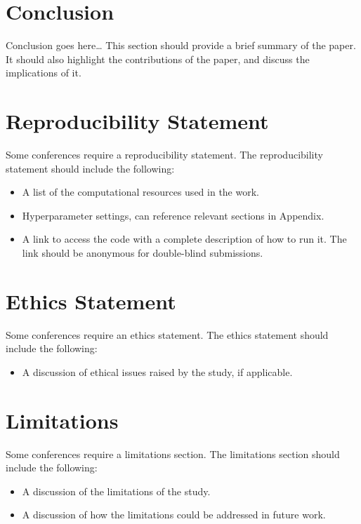 \section{Conclusion}\label{sec:conclusion}

Conclusion goes here\dots{}
This section should provide a brief summary of the paper.
It should also highlight the contributions of the paper,
and discuss the implications of it.


\section{Reproducibility Statement}\label{sec:reproducibility}

Some conferences require a reproducibility statement.
The reproducibility statement
should include the following:
\begin{itemize}
    \item A list of the computational resources used in the work.

    \item Hyperparameter settings,
    can reference relevant sections in Appendix.

    \item A link to access the code
    with a complete description of how to run it.
    The link should be anonymous for double-blind submissions.
\end{itemize}


\section{Ethics Statement}\label{sec:ethics}

Some conferences require an ethics statement.
The ethics statement should include the following:
\begin{itemize}
    \item A discussion of ethical issues raised by the study,
    if applicable.
\end{itemize}


\section{Limitations}\label{sec:limitations}

Some conferences require a limitations section.
The limitations section should include the following:
\begin{itemize}
    \item A discussion of the limitations of the study.
    \item A discussion of how the limitations
    could be addressed in future work.
\end{itemize}


